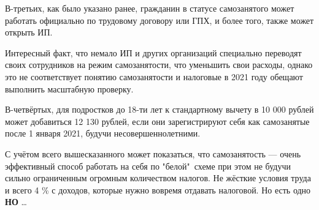 В-третьих, как было указано ранее, гражданин в статусе самозанятого 
может работать официально по трудовому договору или ГПХ, 
и более того, также может открыть ИП. 

Интересный факт, что немало ИП и других организаций 
специально переводят своих сотрудников на режим самозанятости, 
что уменьшить свои расходы, 
однако это не соответствует понятию самозанятости 
и налоговые в 2021 году обещают выполнить масштабную проверку. 

В-четвёртых, для подростков до 18-ти лет к стандартному вычету в 10 000 рублей может добавиться 12 130 рублей, если они зарегистрируют себя как самозанятые после 1 января 2021, будучи несовершеннолетними.

С учётом всего вышесказанного может показаться,
что самозанятость --- очень эффективный способ
работать на себя по "белой"\ схеме при этом не 
будучи сильно ограниченным огромным количеством
налогов. Не жёсткие условия труда и 
всего 4 \% с доходов, которые нужно вовремя 
отдавать налоговой. Но есть одно \textbf{НО} \ldots
